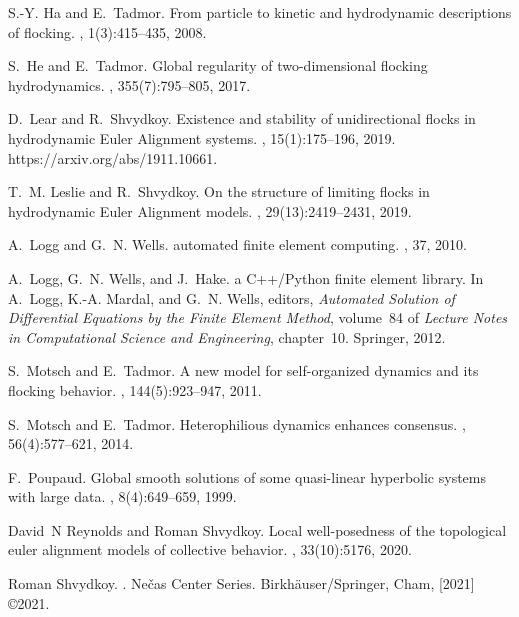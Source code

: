 \documentclass[11pt,letterpaper]{amsart}
\theoremstyle{plain}
\theoremstyle{definition}
\theoremstyle{remark}
\begin{document}
\begin{thebibliography}{10}
S.-Y. Ha and E.~Tadmor.
\newblock From particle to kinetic and hydrodynamic descriptions of flocking.
, 1(3):415--435, 2008.

S.~He and E.~Tadmor.
\newblock Global regularity of two-dimensional flocking hydrodynamics.
, 355(7):795--805, 2017.

D.~Lear and R.~Shvydkoy.
\newblock Existence and stability of unidirectional flocks in hydrodynamic
  {E}uler {A}lignment systems.
, 15(1):175--196, 2019.
\newblock https://arxiv.org/abs/1911.10661.

T.~M. Leslie and R.~Shvydkoy.
\newblock On the structure of limiting flocks in hydrodynamic {E}uler
  {A}lignment models.
, 29(13):2419--2431, 2019.

A.~Logg and G.~N. Wells.
 automated finite element computing.
, 37, 2010.

A.~Logg, G.~N. Wells, and J.~Hake.
 a {C++/Python} finite element library.
\newblock In A.~Logg, {K.-A.} Mardal, and G.~N. Wells, editors, {\em Automated
  Solution of Differential Equations by the Finite Element Method}, volume~84
  of {\em Lecture Notes in Computational Science and Engineering}, chapter~10.
  Springer, 2012.

S.~Motsch and E.~Tadmor.
\newblock A new model for self-organized dynamics and its flocking behavior.
, 144(5):923--947, 2011.

S.~Motsch and E.~Tadmor.
\newblock Heterophilious dynamics enhances consensus.
, 56(4):577--621, 2014.

F.~Poupaud.
\newblock Global smooth solutions of some quasi-linear hyperbolic systems with
  large data.
, 8(4):649--659, 1999.

David~N Reynolds and Roman Shvydkoy.
\newblock Local well-posedness of the topological euler alignment models of
  collective behavior.
, 33(10):5176, 2020.

Roman Shvydkoy.
.
\newblock Ne\v{c}as Center Series. Birkh\"{a}user/Springer, Cham, [2021]
  \copyright 2021.


\end{thebibliography}
\end{document}
